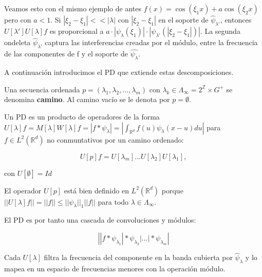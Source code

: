 \medskip

\noindent Veamos esto con el mismo ejemplo de antes $f(x)=\cos(\xi_1 x)+a\cos(\xi_2 x)$ pero con $a<1$. Si $|\xi_2-\xi_1| << |\lambda|$ con $|\xi_2 - \xi_1|$ en el soporte de $\widehat{\psi}_{\lambda'}$, entonces $U[\lambda']U[\lambda]f$ es proporcional a $a\cdot |\psi_\lambda(\xi_1)|\cdot |\psi_{\lambda'}(|\xi_2-\xi_1|)|$. La segunda ondeleta $\widehat{\psi}_{\lambda'}$ captura las interferencias creadas por el módulo, entre la frecuencia de las componentes de f y el soporte de $\widehat{\psi_\lambda}$.

\medskip

\noindent A continuación introducimos el PD que extiende estas descomposiciones.

\medskip

\begin{definicion}
Una secuencia ordenada $p=(\lambda_1,\lambda_2, ... , \lambda_m)$ con $\lambda_k \in \Lambda_\infty=2^{\mathbb{Z}} \times G^{+} $ se denomina \textbf{camino}. Al camino vacío se le denota por $p=\emptyset$. 
\end{definicion}


\begin{definicion}
Un PD es un producto de operadores de la forma $U[\lambda]f=M[\lambda]W[\lambda]f=|f \ast \psi_\lambda|=\left | \int_{\mathbb{R}^d} f(u)\psi_\lambda(x-u) du \right|$ para $f \in L^2(\mathbb{R}^d)$ no conmuntativos por un camino ordenado:

\begin{equation}
  U[p]f=U[\lambda_m]...U[\lambda_2]U[\lambda_1],
\end{equation}

con $U[\emptyset]=Id$
\end{definicion}

\noindent El operador $U[p]$ está bien definido en $L^2(\mathbb{R}^d)$ porque $\left|\left| U[\lambda]f \right|\right| = ||f|| \leq ||\psi_\lambda||_1 ||f||$ para todo $\lambda \in \Lambda_\infty$. 

\noindent El PD es por tanto una cascada de convoluciones y módulos: 

\begin{equation}
  \left| |f \ast \psi_{\lambda_1} | \ast \psi_{\lambda_2} | ... | \ast \psi_{\lambda_m} \right|  
\end{equation}

\medskip

\noindent Cada $U[\lambda]$ filtra la frecuencia del componente en la banda cubierta por $\widehat{\psi}_\lambda$ y lo mapea en un espacio de frecuencias menores con la operación módulo.

